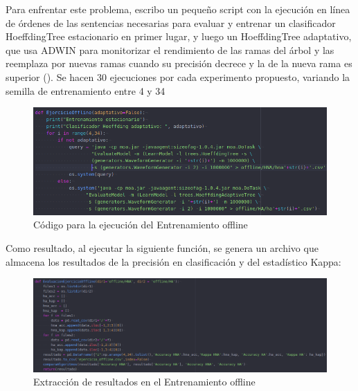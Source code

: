 Para enfrentar este problema, escribo un pequeño script con la ejecución en línea de órdenes de las sentencias necesarias para evaluar y entrenar un clasificador HoeffdingTree estacionario en primer lugar, y luego un HoeffdingTree adaptativo, que usa ADWIN para monitorizar el rendimiento de las ramas del árbol y las reemplaza por nuevas ramas cuando su precisión decrece y la de la nueva rama es superior (\cite{HA}). Se hacen 30 ejecuciones por cada experimento propuesto, variando la semilla de entrenamiento entre 4 y 34

\begin{figure}[H] %
	\centering
	\includegraphics[scale=0.5]{off-code.png}  %
	\caption{Código para la ejecución del Entrenamiento offline} 
	\label{fig:off1}
\end{figure}

Como resultado, al ejecutar la siguiente función, se genera un archivo que almacena los resultados de la precisión en clasificación y del estadístico Kappa:

\begin{figure}[H] %
	\centering
	\includegraphics[scale=0.4]{off-ev.png}  %
	\caption{Extracción de resultados en el Entrenamiento offline} 
	\label{fig:off2}
\end{figure}

